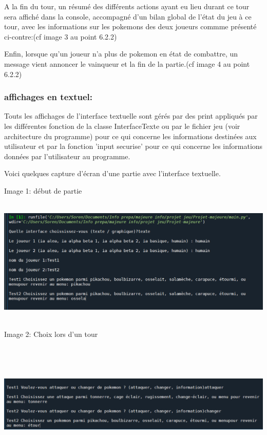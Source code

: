                 \bigskip
    
                A la fin du tour, un résumé des différents actions ayant eu lieu durant ce tour sera affiché dans la console, accompagné d'un bilan global de l'état du jeu à ce tour, avec les informations sur les pokemons des deux joueurs commme présenté ci-contre:(cf image 3  au point 6.2.2)

                \bigskip

                Enfin, lorsque qu'un joueur n'a plus de pokemon en état de combattre, un message vient annoncer le vainqueur et la fin de la partie.(cf image 4  au point 6.2.2)

            \bigskip
            
            \subsubsection{affichages en textuel:}
                Touts les affichages de l'interface textuelle sont gérés par des print appliqués par les différentes fonction de la classe InterfaceTexte ou par le fichier jeu (voir architecture du programme) pour ce qui concerne les informations destinées aux utilisateur et par la fonction 'input securise' pour ce qui concerne les informations données par l'utilisateur au programme.
                
                
                Voici quelques capture d'écran d'une partie avec l'interface textuelle.
                
                Image 1: début de partie
                
                \includegraphics[width=16cm,height=6cm]{images/text1}

                Image 2: Choix lors d'un tour
                
                \includegraphics[width=16cm,height=6cm]{images/text2}

